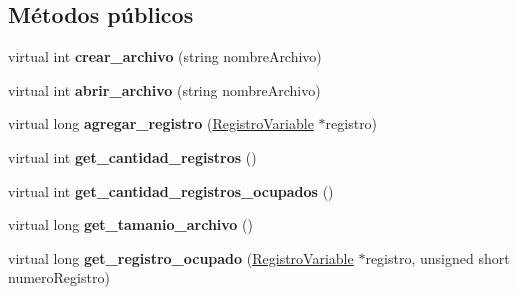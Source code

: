 \subsection*{\-Métodos públicos}
\begin{DoxyCompactItemize}
\item 
\hypertarget{class_manejador_registros_variables_a629f0570bd087d29a15c0747a6355a9e}{virtual int {\bfseries crear\-\_\-archivo} (string nombre\-Archivo)}\label{class_manejador_registros_variables_a629f0570bd087d29a15c0747a6355a9e}

\item 
\hypertarget{class_manejador_registros_variables_ad19bc364ba3e9fcd252fb3875f99f671}{virtual int {\bfseries abrir\-\_\-archivo} (string nombre\-Archivo)}\label{class_manejador_registros_variables_ad19bc364ba3e9fcd252fb3875f99f671}

\item 
\hypertarget{class_manejador_registros_variables_abda9d48da7b4eff10259ba72edd05f83}{virtual long {\bfseries agregar\-\_\-registro} (\hyperlink{class_registro_variable}{\-Registro\-Variable} $\ast$registro)}\label{class_manejador_registros_variables_abda9d48da7b4eff10259ba72edd05f83}

\item 
\hypertarget{class_manejador_registros_variables_ad3f40249a2f553e3e5c6080c36c00fda}{virtual int {\bfseries get\-\_\-cantidad\-\_\-registros} ()}\label{class_manejador_registros_variables_ad3f40249a2f553e3e5c6080c36c00fda}

\item 
\hypertarget{class_manejador_registros_variables_a2bacc89039e667b2d97113fe50ed565b}{virtual int {\bfseries get\-\_\-cantidad\-\_\-registros\-\_\-ocupados} ()}\label{class_manejador_registros_variables_a2bacc89039e667b2d97113fe50ed565b}

\item 
\hypertarget{class_manejador_registros_variables_a650672f5b8cfc34ed60cdaa0a3298d35}{virtual long {\bfseries get\-\_\-tamanio\-\_\-archivo} ()}\label{class_manejador_registros_variables_a650672f5b8cfc34ed60cdaa0a3298d35}

\item 
\hypertarget{class_manejador_registros_variables_a9cdad7a2599c9ebf29cfc6ca985f6879}{virtual long {\bfseries get\-\_\-registro\-\_\-ocupado} (\hyperlink{class_registro_variable}{\-Registro\-Variable} $\ast$registro, unsigned short numero\-Registro)}\label{class_manejador_registros_variables_a9cdad7a2599c9ebf29cfc6ca985f6879}


\end{DoxyCompactItemize}
